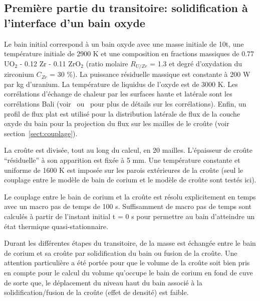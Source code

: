 \subsection{Première partie du transitoire: solidification à l'interface d'un bain oxyde}
Le bain initial correspond à un bain oxyde avec une masse initiale de 10t, une température initiale de 2900 K et une composition en fractions massiques de 0.77 UO$_2$ - 0.12 Zr - 0.11 ZrO$_2$ (ratio molaire $R_{U/Zr}$ = 1.3 et degré  d'oxydation du zirconium $C_{Zr}$ = 30 \%). La puissance résiduelle massique est constante à $200$ W par kg d'uranium. La température de liquidus de l'oxyde est de 3000 K. Les corrélations d'échange de chaleur par les surfaces haute et latérale sont les corrélations Bali (voir~\cite{Bonnet1999} ou~\cite{Tourniaire2009a} pour plus de détails sur les corrélations). Enfin, un profil de flux plat est utilisé pour la distribution latérale de flux de la couche oxyde du bain pour la projection du flux sur les mailles de le croûte (voir section~\ref{sect:couplage}).

La croûte est divisée, tout au long du calcul, en 20 mailles. L'épaisseur de croûte ``résiduelle'' à son apparition est fixée à 5 mm. Une température constante et uniforme de 1600 K est imposée sur les parois extérieures de la croûte (seul le couplage entre le modèle de bain de corium et le modèle de croûte sont testés ici).

Le couplage entre le bain de corium et la croûte est résolu explicitement en temps avec un macro pas de temps de 100 s. Suffisamment de macro pas de temps sont calculés à partir de l'instant initial t = 0 s pour permettre au bain d'atteindre un état thermique quasi-stationnaire.

Durant les différentes étapes du transitoire, de la masse est échangée entre le bain de corium et sa croûte par solidification du bain ou fusion de la croûte. Une attention particulière a été portée pour que le volume de la croûte soit bien pris en compte pour le calcul du volume qu'occupe le bain de corium en fond de cuve de sorte que, le déplacement du niveau haut du bain associé à la solidification/fusion de la croûte (effet de densité) est faible.

